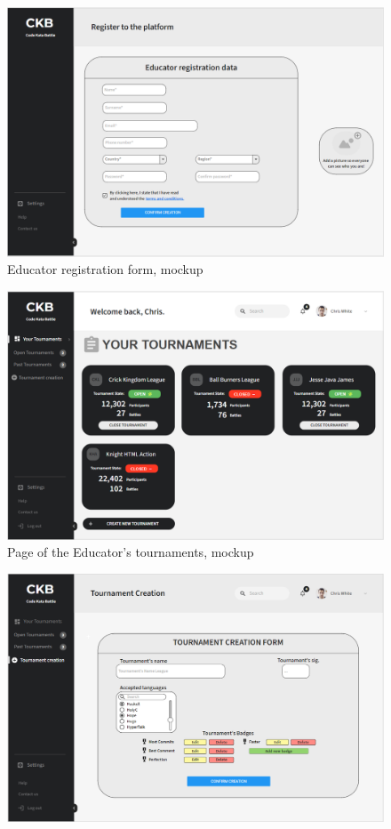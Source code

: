 \documentclass{article}
\begin{document}
{\begin{figure}[H]
    \hspace*{-0.2cm}\includegraphics[scale=0.52]{UserInterface/EducatorRegistration.png}
    \caption{Educator registration form, mockup}
    \label{fig:EducatorRegistrationFormMockup}
\end{figure}
\begin{figure}[H]
    \centering
    \hspace*{-0.2cm}\includegraphics[scale=0.52]{UserInterface/EducatorTournaments.png}
    \caption{Page of the Educator's tournaments, mockup}
    \label{fig:tournamentsPageMockup}
\end{figure}
\begin{figure}[H]
    \centering
    \hspace*{-0.2cm}\includegraphics[scale=0.52]{UserInterface/TournamentCreation.png}

\end{figure}}
\end{document}
